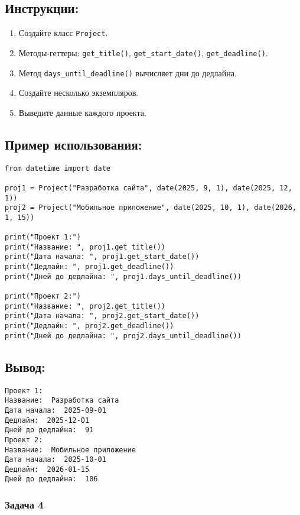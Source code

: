 \begin{enumerate}
\subsection*{Инструкции:}
\begin{enumerate}
    \item Создайте класс \texttt{Project}.
    \item Методы-геттеры: \texttt{get\_title()}, \texttt{get\_start\_date()}, \texttt{get\_deadline()}.
    \item Метод \texttt{days\_until\_deadline()} вычисляет дни до дедлайна.
    \item Создайте несколько экземпляров.
    \item Выведите данные каждого проекта.
\end{enumerate}

\subsection*{Пример использования:}
\begin{lstlisting}[caption=Пример кода]
from datetime import date

proj1 = Project("Разработка сайта", date(2025, 9, 1), date(2025, 12, 1))
proj2 = Project("Мобильное приложение", date(2025, 10, 1), date(2026, 1, 15))

print("Проект 1:")
print("Название: ", proj1.get_title())
print("Дата начала: ", proj1.get_start_date())
print("Дедлайн: ", proj1.get_deadline())
print("Дней до дедлайна: ", proj1.days_until_deadline())

print("Проект 2:")
print("Название: ", proj2.get_title())
print("Дата начала: ", proj2.get_start_date())
print("Дедлайн: ", proj2.get_deadline())
print("Дней до дедлайна: ", proj2.days_until_deadline())
\end{lstlisting}

\subsection*{Вывод:}
\begin{lstlisting}[caption=Ожидаемый вывод]
Проект 1:
Название:  Разработка сайта
Дата начала:  2025-09-01
Дедлайн:  2025-12-01
Дней до дедлайна:  91
Проект 2:
Название:  Мобильное приложение
Дата начала:  2025-10-01
Дедлайн:  2026-01-15
Дней до дедлайна:  106
\end{lstlisting}


\end{enumerate}


\subsubsection{Задача 4}


